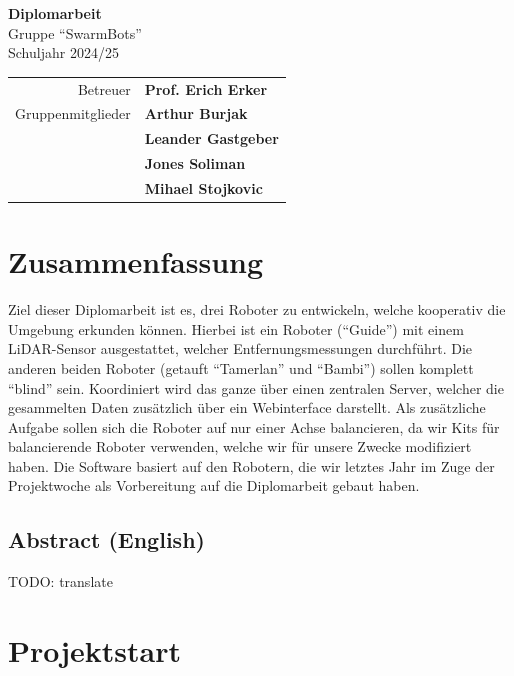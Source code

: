 \documentclass[12pt]{article}
\begin{document}
	
	
	\begin{titlepage}
		\centering
		\Huge
		\textbf{Diplomarbeit} \\
		\huge
		Gruppe ``SwarmBots'' \\
		Schuljahr 2024/25 \\
		\vspace{2cm}
		\Large
		\begin{tabular}{r @{: } >{\bfseries} l}
			Betreuer & Prof. Erich Erker\\
			Gruppenmitglieder & Arthur Burjak \\
			& Leander Gastgeber \\
			& Jones Soliman \\
			& Mihael Stojkovic
	\end{tabular}
	\end{titlepage}
	\newpage
	
	\tableofcontents
	\newpage
	
	\section{Zusammenfassung}
	Ziel dieser Diplomarbeit ist es, drei Roboter zu entwickeln,
	welche kooperativ die Umgebung erkunden können.
	Hierbei ist ein Roboter (``Guide'') mit einem LiDAR-Sensor ausgestattet,
	welcher Entfernungsmessungen durchführt.
	Die anderen beiden Roboter (getauft ``Tamerlan'' und ``Bambi'')
	sollen komplett ``blind'' sein.
	Koordiniert wird das ganze über einen zentralen Server,
	welcher die gesammelten Daten zusätzlich über ein Webinterface darstellt.
	Als zusätzliche Aufgabe sollen sich die Roboter auf nur einer Achse balancieren,
	da wir Kits für balancierende Roboter verwenden,
	welche wir für unsere Zwecke modifiziert haben.
	Die Software basiert auf den Robotern,
	die wir letztes Jahr im Zuge der Projektwoche als Vorbereitung auf die Diplomarbeit gebaut haben.
	\subsection{Abstract (English)}
	TODO: translate
	\section{Projektstart}
\end{document}
